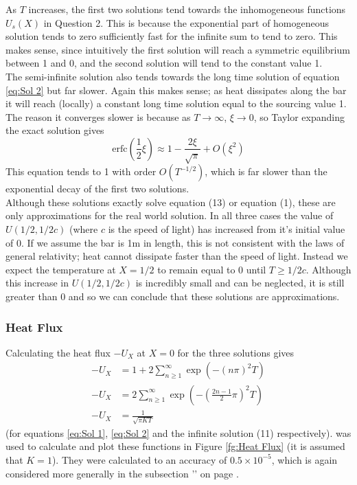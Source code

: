 \documentclass[10pt,a4paper,notitlepage]{article}
\newcommand{\erfc}{\text{erfc}}
\begin{document}
As $T$ increases, the first two solutions tend towards the inhomogeneous functions $U_{s}(X)$ in Question 2. This is because the exponential part of homogeneous solution tends to zero sufficiently fast for the infinite sum to tend to zero. This makes sense, since intuitively the first solution will reach a symmetric equilibrium between 1 and 0, and the second solution will tend to the constant value 1.\\
The semi-infinite solution also tends towards the long time solution of equation \eqref{eq:Sol 2} but far slower. Again this makes sense; as heat dissipates along the bar it will reach (locally) a constant long time solution equal to the sourcing value 1. The reason it converges slower is because as $T\rightarrow \infty$, $\xi\rightarrow 0$, so Taylor expanding the exact solution gives
\begin{equation}
\erfc\left(\frac{1}{2}\xi\right)\approx 1-\frac{2\xi}{\sqrt{\pi}}+O\left(\xi^{2}\right)
\end{equation}
This equation tends to 1 with order $O\left(T^{-1/2}\right)$, which is far slower than the exponential decay of the first two solutions. \\

Although these solutions exactly solve equation (13) or equation (1), these are only approximations for the real world solution. In all three cases the value of $U(1/2,1/2c)$ (where $c$ is the speed of light) has increased from it's initial value of 0. If we assume the bar is 1m in length, this is not consistent with the laws of general relativity; heat cannot dissipate faster than the speed of light. Instead we expect the temperature at $X=1/2$ to remain equal to 0 until $T\geq 1/2c$.  Although this increase in $U(1/2,1/2c)$ is incredibly small and can be neglected, it is still greater than 0 and so we can conclude that these solutions are approximations. 

 \subsubsection*{\centering Heat Flux}\label{subsec:Heat Flux}
Calculating the heat flux $-U_{X}$ at $X=0$ for the three solutions gives
\begin{equation} \label{eq:HeatFlux}
\begin{aligned}
-U_{X} &= 1+2\sum_{n\geq 1}^{\infty}\exp\left(-\left(n\pi\right)^{2}T\right) \\
-U_{X} &= 2\sum_{n\geq 1}^{\infty}\exp\left(-\left(\frac{2n-1}{2}\pi\right)^{2}T\right) \\
-U_{X} &= \frac{1}{\sqrt{\pi KT}}
\end{aligned}
\end{equation}
(for equations \eqref{eq:Sol 1}, \eqref{eq:Sol 2} and the infinite solution (11) respectively).   was used to calculate and plot these functions in Figure \ref{fg:Heat Flux} (it is assumed that $K=1$). They were calculated to an accuracy of $0.5\times 10^{-5}$, which is again considered more generally in the subsection '' on page \pageref{subsec:Truncated Error}. 
\end{document}
